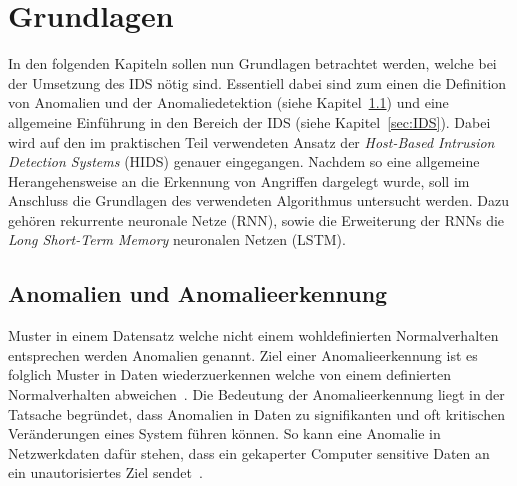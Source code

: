 \chapter{Grundlagen}\label{ch:grundlagen}
    In den folgenden Kapiteln sollen nun Grundlagen betrachtet werden, welche bei der Umsetzung des IDS nötig sind.
    Essentiell dabei sind zum einen die Definition von Anomalien und der Anomaliedetektion (siehe Kapitel~\ref{sec:Anomalieerkennung})
    und eine allgemeine Einführung in den Bereich der IDS (siehe Kapitel~\ref{sec:IDS}).
    Dabei wird auf den im praktischen Teil verwendeten Ansatz der \textit{Host-Based Intrusion Detection Systems} (HIDS) genauer eingegangen.
    Nachdem so eine allgemeine Herangehensweise an die Erkennung von Angriffen dargelegt wurde, 
    soll im Anschluss die Grundlagen des verwendeten Algorithmus untersucht werden.
    Dazu gehören rekurrente neuronale Netze (RNN), sowie die Erweiterung der RNNs die \textit{Long Short-Term Memory} neuronalen Netzen (LSTM)\@.

    \section{Anomalien und Anomalieerkennung}
    \label{sec:Anomalieerkennung}
        Muster in einem Datensatz welche nicht einem wohldefinierten Normalverhalten entsprechen werden Anomalien genannt.
        Ziel einer Anomalieerkennung ist es folglich Muster in Daten wiederzuerkennen welche von einem definierten Normalverhalten abweichen~\cite{ANOMALYSURVEY}.
        Die Bedeutung der Anomalieerkennung liegt in der Tatsache begründet, dass Anomalien in Daten zu signifikanten und oft kritischen Veränderungen eines System führen können. 
        So kann eine Anomalie in Netzwerkdaten dafür stehen, dass ein gekaperter Computer sensitive Daten an ein unautorisiertes Ziel sendet~\cite{ANOMALYEXAMPLE}.

